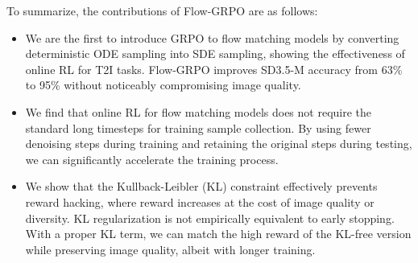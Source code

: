
To summarize, the contributions of Flow-GRPO are as follows:
\begin{itemize}[leftmargin=15pt]
\item We are the first to introduce GRPO to flow matching models by converting deterministic ODE sampling into SDE sampling, showing the effectiveness of online RL for T2I tasks. Flow-GRPO improves SD3.5-M accuracy from 63\% to 95\% without noticeably compromising image quality.
\item We find that online RL for flow matching models does not require the standard long timesteps for training sample collection. By using fewer denoising steps during training and retaining the original steps during testing, we can significantly accelerate the training process.
\item We show that the Kullback-Leibler (KL) constraint effectively prevents reward hacking, where reward increases at the cost of image quality or diversity. KL regularization is not empirically equivalent to early stopping. With a proper KL term, we can match the high reward of the KL-free version while preserving image quality, albeit with longer training.
\end{itemize}
